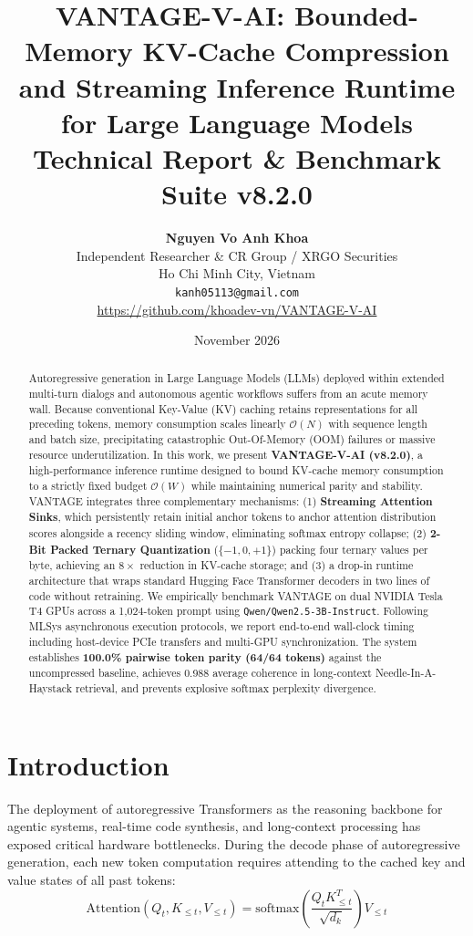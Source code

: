 \documentclass[10pt,twocolumn,letterpaper]{article}
\title{\textbf{VANTAGE-V-AI: Bounded-Memory KV-Cache Compression and Streaming Inference Runtime for Large Language Models} \\ \large Technical Report \& Benchmark Suite v8.2.0}
\author{
  \textbf{Nguyen Vo Anh Khoa} \\
  Independent Researcher \& CR Group / XRGO Securities \\
  Ho Chi Minh City, Vietnam \\
  \texttt{kanh05113@gmail.com} \\
  \url{https://github.com/khoadev-vn/VANTAGE-V-AI}
}
\date{November 2026}
\begin{document}
\maketitle

\begin{abstract}
Autoregressive generation in Large Language Models (LLMs) deployed within extended multi-turn dialogs and autonomous agentic workflows suffers from an acute memory wall. Because conventional Key-Value (KV) caching retains representations for all preceding tokens, memory consumption scales linearly $\mathcal{O}(N)$ with sequence length and batch size, precipitating catastrophic Out-Of-Memory (OOM) failures or massive resource underutilization. In this work, we present \textbf{VANTAGE-V-AI (v8.2.0)}, a high-performance inference runtime designed to bound KV-cache memory consumption to a strictly fixed budget $\mathcal{O}(W)$ while maintaining numerical parity and stability. VANTAGE integrates three complementary mechanisms: (1) \textbf{Streaming Attention Sinks}, which persistently retain initial anchor tokens to anchor attention distribution scores alongside a recency sliding window, eliminating softmax entropy collapse; (2) \textbf{2-Bit Packed Ternary Quantization} ($\{-1, 0, +1\}$) packing four ternary values per byte, achieving an $8\times$ reduction in KV-cache storage; and (3) a drop-in runtime architecture that wraps standard Hugging Face Transformer decoders in two lines of code without retraining. We empirically benchmark VANTAGE on dual NVIDIA Tesla T4 GPUs across a 1,024-token prompt using \texttt{Qwen/Qwen2.5-3B-Instruct}. Following MLSys asynchronous execution protocols, we report end-to-end wall-clock timing including host-device PCIe transfers and multi-GPU synchronization. The system establishes \textbf{100.0\% pairwise token parity (64/64 tokens)} against the uncompressed baseline, achieves 0.988 average coherence in long-context Needle-In-A-Haystack retrieval, and prevents explosive softmax perplexity divergence.
\end{abstract}

\section{Introduction}
The deployment of autoregressive Transformers as the reasoning backbone for agentic systems, real-time code synthesis, and long-context processing has exposed critical hardware bottlenecks. During the decode phase of autoregressive generation, each new token computation requires attending to the cached key and value states of all past tokens:
\begin{equation}
\text{Attention}(Q_t, K_{\le t}, V_{\le t}) = \text{softmax}\left(\frac{Q_t K_{\le t}^T}{\sqrt{d_k}}\right) V_{\le t}
\end{equation}
\end{document}

